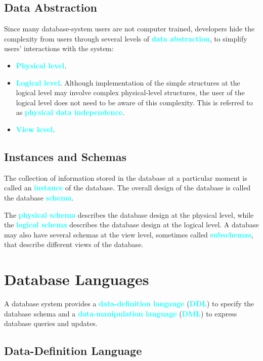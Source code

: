 \documentclass[a4paper,12pt,twoside,openany]{book}
\newcommand{\textcy}[1]{\textbf{\textcolor{cyan}{#1}}}
\begin{document}
\subsection{Data Abstraction}

Since many database-system users are not computer trained, developers hide the complexity from users through several levels of \textcy{data abstraction}, to simplify users' interactions with the system:
\begin{itemize}
    \item\textcy{Physical level}.
    \item\textcy{Logical level}. Although implementation of the simple structures at the logical level may involve complex physical-level structures, the user of the logical level does not need to be aware of this complexity. This is referred to as \textcy{physical data independence}.
    \item\textcy{View level}.
\end{itemize}

\subsection{Instances and Schemas}

The collection of information stored in the database at a particular moment is called an \textcy{instance} of the database. The overall design of the database is called the database \textcy{schema}.

The \textcy{physical schema} describes the database design at the physical level, while the \textcy{logical schema} describes the database design at the logical level. A database may also have several schemas at the view level, sometimes called \textcy{subschemas}, that describe different views of the database.

\section{Database Languages}

A database system provides a \textcy{data-definition langauge} (\textcy{DDL}) to specify the database schema and a \textcy{data-manipulation language} (\textcy{DML}) to express database queries and updates.

\subsection{Data-Definition Language}
\end{document}
